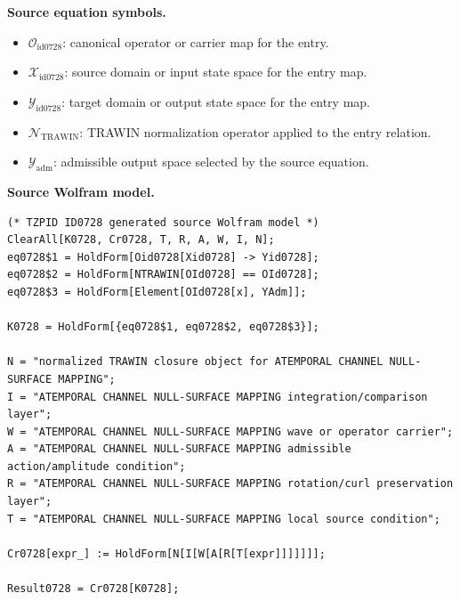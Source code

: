 \begin{minipage}[t]{0.49\linewidth}
\begingroup
\small
\raggedright
\textbf{Source equation symbols.}\par
\begin{itemize}[leftmargin=1.35em,itemsep=1pt,topsep=1pt,parsep=0pt]
    \item $\mathcal{O}_{\mathrm{id0728}}$: canonical operator or carrier map for the entry.
    \item $\mathcal{X}_{\mathrm{id0728}}$: source domain or input state space for the entry map.
    \item $\mathcal{Y}_{\mathrm{id0728}}$: target domain or output state space for the entry map.
    \item $\mathcal{N}_{\mathrm{TRAWIN}}$: TRAWIN normalization operator applied to the entry relation.
    \item $\mathcal{Y}_{\mathrm{adm}}$: admissible output space selected by the source equation.
\end{itemize}
\endgroup
\end{minipage}\hfill
\begin{minipage}[t]{0.47\linewidth}
\begingroup
\scriptsize
\raggedright
\textbf{Source Wolfram model.}\par
\begin{Verbatim}[fontsize=\tiny,breaklines=true,breakanywhere=true]
(* TZPID ID0728 generated source Wolfram model *)
ClearAll[K0728, Cr0728, T, R, A, W, I, N];
eq0728$1 = HoldForm[Oid0728[Xid0728] -> Yid0728];
eq0728$2 = HoldForm[NTRAWIN[OId0728] == OId0728];
eq0728$3 = HoldForm[Element[OId0728[x], YAdm]];

K0728 = HoldForm[{eq0728$1, eq0728$2, eq0728$3}];

N = "normalized TRAWIN closure object for ATEMPORAL CHANNEL NULL-SURFACE MAPPING";
I = "ATEMPORAL CHANNEL NULL-SURFACE MAPPING integration/comparison layer";
W = "ATEMPORAL CHANNEL NULL-SURFACE MAPPING wave or operator carrier";
A = "ATEMPORAL CHANNEL NULL-SURFACE MAPPING admissible action/amplitude condition";
R = "ATEMPORAL CHANNEL NULL-SURFACE MAPPING rotation/curl preservation layer";
T = "ATEMPORAL CHANNEL NULL-SURFACE MAPPING local source condition";

Cr0728[expr_] := HoldForm[N[I[W[A[R[T[expr]]]]]]];

Result0728 = Cr0728[K0728];
\end{Verbatim}
\endgroup
\end{minipage}

